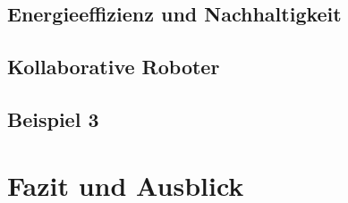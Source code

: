 \documentclass[a4paper,12pt, german]{report}
\begin{document}








\section{Energieeffizienz und Nachhaltigkeit}

\section{Kollaborative Roboter}

\section{Beispiel 3}


\chapter{Fazit und Ausblick}

\listoffigures

\clearpage




\appendix
\end{document}
